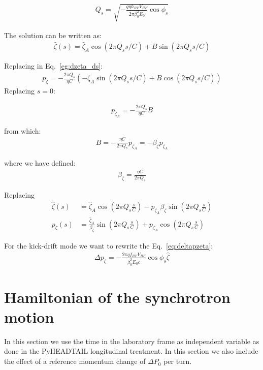 \begin{align}
Q_s 
= \sqrt{-  \frac{ q \eta h_{RF} V_{RF}}{2\pi\beta_0^2 E_0}\cos{\phi_s}}
\end{align}

The solution can be written as:
\begin{align}
\hat{\zeta}(s) = \hat{\zeta}_A \cos\left( 2 \pi Q_s s/C\right) + B \sin\left( 2 \pi Q_s s/C \right)
\end{align}

Replacing in Eq.~\ref{eg:dzeta_ds}:
\begin{align}
p_\zeta = - \frac{2\pi Q_s} {\eta C} \left( -\zeta_A \sin\left( 2 \pi Q_s s/C\right) + B \cos\left( 2 \pi Q_s s/C \right)\right)
\end{align}
Replacing $s=0$:

\begin{align}
p_{\zeta_A} = - \frac{2\pi Q_s} {\eta C} B
\end{align}

from which:
\begin{align}
B = -\frac{\eta C}{2\pi Q_s}p_{\zeta_A} = -\beta_\zeta p_{\zeta_A}
\end{align}

where we have defined:
\begin{align}
\beta_\zeta = \frac{\eta C}{2\pi Q_s}
\end{align}

Replacing
\begin{align}
\hat{\zeta}(s) &= \hat{\zeta}_A \cos\left( 2 \pi Q_s \frac{s}{C}\right) -p_{\zeta_A} \beta_\zeta \sin\left( 2 \pi Q_s \frac{s}{C} \right)\\
p_\zeta(s) &= \frac{\hat{\zeta}_A}{\beta_\zeta} \sin\left( 2 \pi Q_s \frac{s}{C}\right)
           + p_{\zeta_A} \cos\left( 2 \pi Q_s \frac{s}{C}\right)
\end{align}

For the kick-drift mode we want to rewrite the Eq.~\ref{eq:deltapzeta}:
\begin{align}
\Delta {p}_\zeta =-\frac{2\pi q f_{RF} V_{RF}}{\beta_0^3 E_0 c}\cos{\phi_s}\hat{\zeta}
\end{align}

\section{Hamiltonian of the synchrotron motion}

In this section we use the time in the laboratory frame as independent variable as done in the PyHEADTAIL longitudinal treatment. In this section we also include the effect of a reference momentum change of $\Delta P_0$ per turn.

